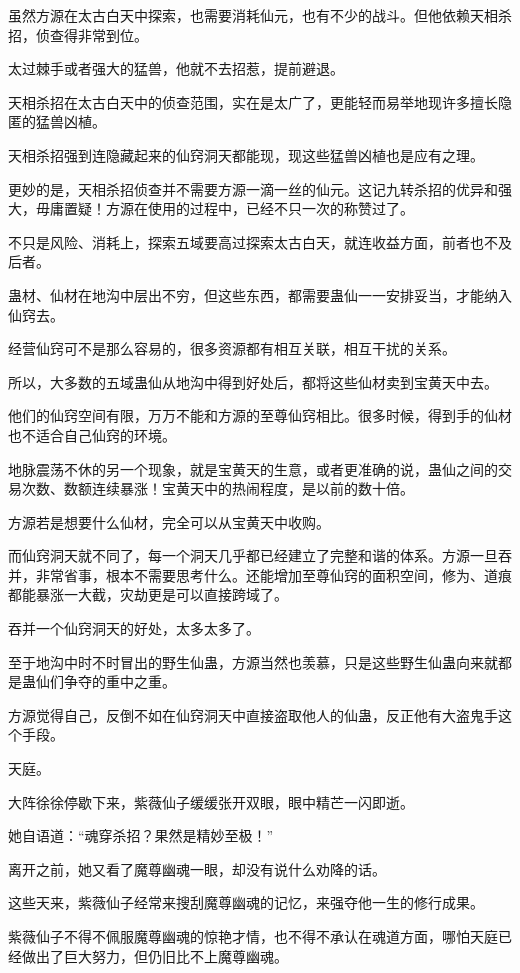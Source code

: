 \begin{this_body}
虽然方源在太古白天中探索，也需要消耗仙元，也有不少的战斗。但他依赖天相杀招，侦查得非常到位。

太过棘手或者强大的猛兽，他就不去招惹，提前避退。

天相杀招在太古白天中的侦查范围，实在是太广了，更能轻而易举地现许多擅长隐匿的猛兽凶植。

天相杀招强到连隐藏起来的仙窍洞天都能现，现这些猛兽凶植也是应有之理。

更妙的是，天相杀招侦查并不需要方源一滴一丝的仙元。这记九转杀招的优异和强大，毋庸置疑！方源在使用的过程中，已经不只一次的称赞过了。

不只是风险、消耗上，探索五域要高过探索太古白天，就连收益方面，前者也不及后者。

蛊材、仙材在地沟中层出不穷，但这些东西，都需要蛊仙一一安排妥当，才能纳入仙窍去。

经营仙窍可不是那么容易的，很多资源都有相互关联，相互干扰的关系。

所以，大多数的五域蛊仙从地沟中得到好处后，都将这些仙材卖到宝黄天中去。

他们的仙窍空间有限，万万不能和方源的至尊仙窍相比。很多时候，得到手的仙材也不适合自己仙窍的环境。

地脉震荡不休的另一个现象，就是宝黄天的生意，或者更准确的说，蛊仙之间的交易次数、数额连续暴涨！宝黄天中的热闹程度，是以前的数十倍。

方源若是想要什么仙材，完全可以从宝黄天中收购。

而仙窍洞天就不同了，每一个洞天几乎都已经建立了完整和谐的体系。方源一旦吞并，非常省事，根本不需要思考什么。还能增加至尊仙窍的面积空间，修为、道痕都能暴涨一大截，灾劫更是可以直接跨域了。

吞并一个仙窍洞天的好处，太多太多了。

至于地沟中时不时冒出的野生仙蛊，方源当然也羡慕，只是这些野生仙蛊向来就都是蛊仙们争夺的重中之重。

方源觉得自己，反倒不如在仙窍洞天中直接盗取他人的仙蛊，反正他有大盗鬼手这个手段。

天庭。

大阵徐徐停歇下来，紫薇仙子缓缓张开双眼，眼中精芒一闪即逝。

她自语道：“魂穿杀招？果然是精妙至极！”

离开之前，她又看了魔尊幽魂一眼，却没有说什么劝降的话。

这些天来，紫薇仙子经常来搜刮魔尊幽魂的记忆，来强夺他一生的修行成果。

紫薇仙子不得不佩服魔尊幽魂的惊艳才情，也不得不承认在魂道方面，哪怕天庭已经做出了巨大努力，但仍旧比不上魔尊幽魂。


\end{this_body}
